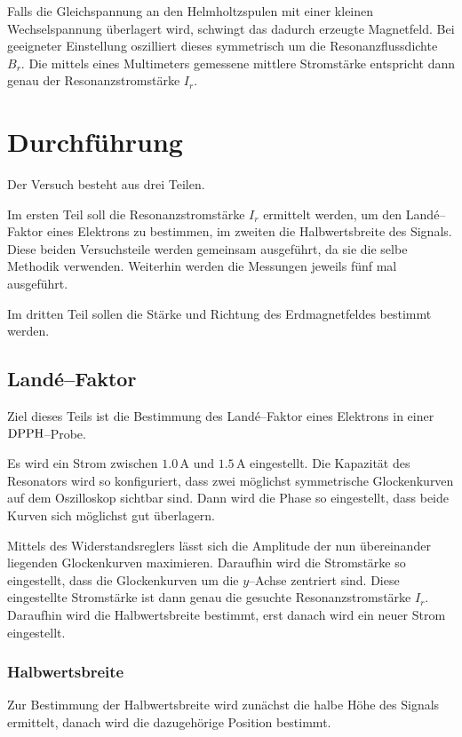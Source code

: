 \documentclass[12pt,a4paper]{scrartcl}
\numberwithin{equation}{section} %
\begin{document}
Falls die Gleichspannung an den Helmholtzspulen mit einer kleinen Wechselspannung überlagert wird, schwingt das dadurch erzeugte Magnetfeld. Bei geeigneter Einstellung oszilliert dieses symmetrisch um die Resonanzflussdichte $B_r$. Die mittels eines Multimeters gemessene mittlere Stromstärke entspricht dann genau der Resonanzstromstärke $I_r$.

\clearpage
\hypertarget{durchfuxfchrung}{\section{Durchführung}\label{durchfuxfchrung}}
Der Versuch besteht aus drei Teilen.

Im ersten Teil soll die Resonanzstromstärke $I_r$ ermittelt werden, um den Landé--Faktor eines Elektrons zu bestimmen, im zweiten die Halbwertsbreite des Signals. Diese beiden Versuchsteile werden gemeinsam ausgeführt, da sie die selbe Methodik verwenden. Weiterhin werden die Messungen jeweils fünf mal ausgeführt.

Im dritten Teil sollen die Stärke und Richtung des Erdmagnetfeldes bestimmt werden.

\subsection{Landé--Faktor}
\label{durchfuxfchrung:Lande-Faktor}
Ziel dieses Teils ist die Bestimmung des Landé--Faktor eines Elektrons in einer $\ce{DPPH}$--Probe.

Es wird ein Strom zwischen $1.0\mathrm{\, A}$ und $1.5 \mathrm{\, A}$ eingestellt. Die Kapazität des Resonators wird so konfiguriert, dass zwei möglichst symmetrische Glockenkurven auf dem Oszilloskop sichtbar sind. Dann wird die Phase so eingestellt, dass beide Kurven sich möglichst gut überlagern.

Mittels des Widerstandsreglers lässt sich die Amplitude der nun übereinander liegenden Glockenkurven maximieren. Daraufhin wird die Stromstärke so eingestellt, dass die Glockenkurven um die $y$--Achse zentriert sind. Diese eingestellte Stromstärke ist dann genau die gesuchte Resonanzstromstärke $I_r$. Daraufhin wird die Halbwertsbreite bestimmt, erst danach wird ein neuer Strom eingestellt.

\subsubsection{Halbwertsbreite}
\label{durchfuxfchrung:Halbwertsbreite}
Zur Bestimmung der Halbwertsbreite wird zunächst die halbe Höhe des Signals ermittelt, danach wird die dazugehörige Position bestimmt.
\end{document}
